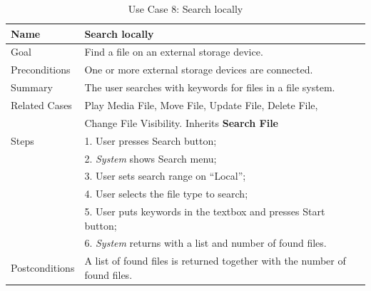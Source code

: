 \begin{table}[h!]
\centering
\begin{tabular}{|l|l|}
\hline
Name & Search locally\\ \hline
Goal & Find a file on an external storage device.\\ \hline
Preconditions & One or more external storage devices are connected. \\ \hline
Summary & The user searches with keywords for files in a file system.\\ \hline

Related Cases & Play Media File, Move File, Update File, Delete File, \\ 
              & Change File Visibility. Inherits \textbf{Search File} \\ \hline
Steps &  1. User presses Search button; \\
      &  2. \textit{System} shows Search menu; \\
      &  3. User sets search range on ``Local''; \\
      &  4. User selects the file type to search; \\
      &  5. User puts keywords in the textbox and presses Start button; \\
      &  6. \textit{System} returns with a list and number of found files. 
        \\ \hline
Postconditions & A list of found files is returned together with the number of found files.
\\ \hline
\end{tabular}
\caption{Use Case 8: Search locally}
\label{tab:UC8}
\end{table}

